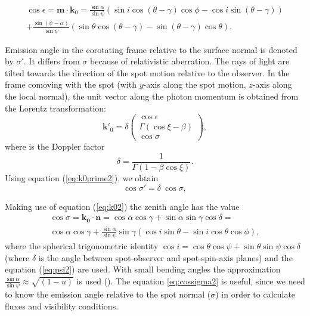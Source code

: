 \documentclass{wihuri}
\def\be{\begin{equation}}
\def\ee{\end{equation}}
\def\Dop{\delta}
\newcommand{\bmath}[1]{\boldsymbol{#1}}
\begin{document}
\be \label{eq:kx-comp}
\begin{split}
\cos\epsilon= \bmath{m} \cdot \bmath{k}_0
=\frac{\sin\alpha}{\sin\psi} (\sin i \cos(\theta -\gamma)\cos \phi -\cos i \sin (\theta -\gamma)) \\ + \frac{\sin (\psi - \alpha)}{\sin \psi}(\sin \theta \cos (\theta -\gamma)-\sin (\theta -\gamma)\cos \theta).
\end{split}
\ee


Emission angle in the corotating frame relative to the surface normal is denoted by
$\sigma'$.  It differs from $\sigma$ because of relativistic aberration. The rays of light are tilted towards the direction of the spot motion relative to the observer.
In the frame comoving with the spot 
(with $y$-axis along the spot motion, $z$-axis along the local normal), 
the unit vector along the photon momentum  is 
obtained from the Lorentz transformation: 
\be \label{eq:k0prime2}
\bmath{k}'_0 = \Dop
\left( \begin{array}{c}
\cos \epsilon \\
\Gamma (\cos\xi-\beta)\\ 
\cos\sigma
\end{array}
\right) ,
\ee 
where is the Doppler factor 
\be \label{eq:dop2}
\Dop=\frac{1}{\Gamma(1-\beta\cos\xi)} .
\ee
Using equation (\ref{eq:k0prime2}), we obtain
\be \label{eq:aberr2}
\cos\sigma' =   \Dop \ \cos\sigma ,
\ee
 
Making use of equation (\ref{eq:k02}) the zenith angle has the value
\be\label{eq:cossigma2}
\begin{split}
\cos\sigma = \bmath{k_{0}}\cdot\bmath{n} = \cos\alpha\cos\gamma+\sin\alpha\sin\gamma\cos\delta = \\
\cos \alpha  \cos \gamma + \frac{\sin \alpha}{\sin \psi} \sin \gamma (\cos i \sin \theta - \sin i \cos \theta \cos \phi),
\end{split}
\ee
where the spherical trigonometric identity $\cos i = \cos\theta\cos\psi+\sin\theta\sin\psi\cos\delta$ (where $\delta$ is the angle between spot-observer and spot-spin-axis planes) and the equation (\ref{eq:psi2}) are used. With small bending angles the approximation $\frac{\sin \alpha}{\sin \psi} \approx \sqrt{(1-u)}$ is used (\cite{beloborodov}). 
The equation \ref{eq:cossigma2} is useful, since we need to know the emission angle relative to the spot normal ($\sigma$) in order to calculate fluxes and visibility conditions. 
\end{document}
